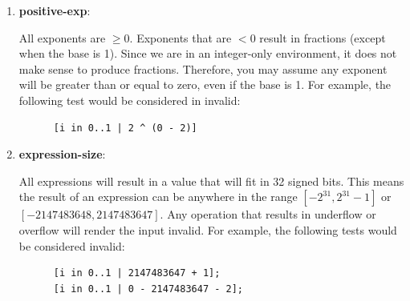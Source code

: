 \documentclass{article}
\newcommand{\assertiondest}[1]{\hypertarget{#1}{\textbf{#1}:}}
\begin{document}
\begin{enumerate}
    would be considered invalid:
    \begin{lstlisting}
      [i in 0..1 | -1];
      [i in 0..1 | 2147483648];
      [i in 0..2147483648 | 0];
      [i in -1..1 | 0];
    \end{lstlisting}
  \item
    \assertiondest{positive-exp}
    All exponents are $\geq 0$. Exponents that are $< 0$ result in fractions (except when the
    base is 1). Since we are in an integer-only environment, it does not make sense to produce
    fractions. Therefore, you may assume any exponent will be greater than or equal to zero, even
    if the base is 1. For example, the following test would be considered in invalid:
    \begin{lstlisting}
      [i in 0..1 | 2 ^ (0 - 2)]
    \end{lstlisting}
  \item
    \assertiondest{expression-size}
    All expressions will result in a value that will fit in 32 signed bits. This means the result
    of an expression can be anywhere in the range $[-2^{31}, 2^{31} - 1]$ or $[-2147483648,
    2147483647]$. Any operation that results in underflow or overflow will render the input
    invalid. For example, the following tests would be considered invalid:
    \begin{lstlisting}
      [i in 0..1 | 2147483647 + 1];
      [i in 0..1 | 0 - 2147483647 - 2];
    \end{lstlisting}
\end{enumerate}
\end{document}
